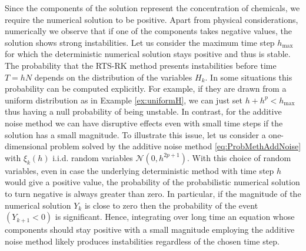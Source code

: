 \documentclass{siamart1116}
\numberwithin{theorem}{section}
\begin{document}
Since the components of the solution represent the concentration of chemicals, we require the numerical solution to be positive. Apart from physical considerations, numerically we observe that if one of the components takes negative values, the solution shows strong instabilities. Let us consider the maximum time step $h_{\max}$ for which the deterministic numerical solution stays positive and thus is stable. The probability that the RTS-RK method presents instabilities before time $T = hN$ depends on the distribution of the variables $H_k$. In some situations this probability can be computed explicitly. For example, if they are drawn from a uniform distribution as in Example \ref{ex:uniformH}, we can just set $h + h^p < h_{\max}$ thus having a null probability of being unstable. In contrast, for the additive noise method we can have disruptive effects even with small time steps if the solution has a small magnitude. To illustrate this issue, let us consider a one-dimensional problem solved by the additive noise method \eqref{eq:ProbMethAddNoise} with $\xi_k(h)$ i.i.d. random variables $\mathcal{N}(0, h^{2p + 1})$. With this choice of random variables, even in case the underlying deterministic method with time step $h$ would give a positive value, the probability of the probabilistic numerical solution to turn negative is always greater than zero. In particular, if the magnitude of the numerical solution $Y_k$ is close to zero then the probability of the event $(Y_{k+1} < 0)$ is significant. Hence, integrating over long time an equation whose components should stay positive with a small magnitude employing the additive noise method likely produces instabilities regardless of the chosen time step.
\end{document}
